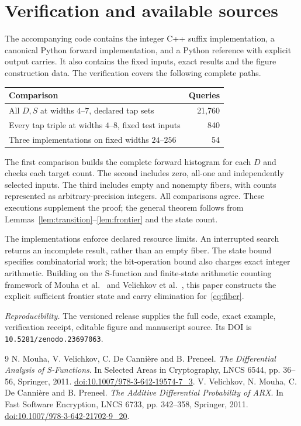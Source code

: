 \documentclass[11pt,a4paper]{article}
\theoremstyle{definition}\newtheorem{definition}[theorem]{Definition}
\begin{document}
\section{Verification and available sources}
The accompanying code contains the integer C++ suffix implementation, a canonical
Python forward implementation, and a Python reference with explicit output carries.
It also contains the fixed inputs, exact results and the figure construction data.
The verification covers the following complete paths.
\begin{center}
\begin{tabular}{lr}
\toprule
Comparison & Queries\\
\midrule
All $D,S$ at widths $4$--$7$, declared tap sets & 21,760\\
Every tap triple at widths $4$--$8$, fixed test inputs & 840\\
Three implementations on fixed widths $24$--$256$ & 54\\
\bottomrule
\end{tabular}
\end{center}
The first comparison builds the complete forward histogram for each $D$ and
checks each target count. The second includes zero, all-one and independently
selected inputs. The third includes empty and nonempty fibers, with counts
represented as arbitrary-precision integers. All comparisons agree.
These executions supplement the proof; the general theorem follows from
Lemmas~\ref{lem:transition}--\ref{lem:frontier} and the state count.

The implementations enforce declared resource limits. An interrupted search
returns an incomplete result, rather than an empty fiber.
The state bound specifies combinatorial work; the bit-operation bound also charges exact integer arithmetic.
Building on the S-function and finite-state arithmetic counting framework of Mouha et al.~\cite{mouha2011} and Velichkov et al.~\cite{velichkov2011}, this paper constructs the explicit sufficient frontier state and carry elimination for~\eqref{eq:fiber}.

\noindent\textit{Reproducibility.}
The versioned release supplies the full code, exact example, verification receipt,
editable figure and manuscript source. Its DOI is \texttt{10.5281/zenodo.23697063}.

\begin{thebibliography}{9}
N. Mouha, V. Velichkov, C. De Canni\`ere and B. Preneel.
\emph{The Differential Analysis of S-Functions}.
In Selected Areas in Cryptography, LNCS 6544, pp. 36--56, Springer, 2011.
\href{https://doi.org/10.1007/978-3-642-19574-7_3}{doi:10.1007/978-3-642-19574-7\_3}.
V. Velichkov, N. Mouha, C. De Canni\`ere and B. Preneel.
\emph{The Additive Differential Probability of ARX}.
In Fast Software Encryption, LNCS 6733, pp. 342--358, Springer, 2011.
\href{https://doi.org/10.1007/978-3-642-21702-9_20}{doi:10.1007/978-3-642-21702-9\_20}.
\end{thebibliography}
\end{document}
